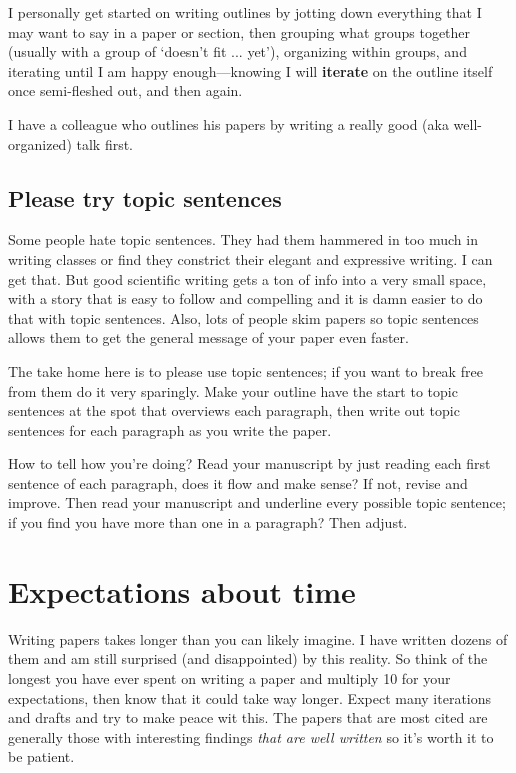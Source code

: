 \documentclass[11pt,letter]{article}
\begin{document}
I personally get started on writing outlines by jotting down everything that I may want to say in a paper or section, then grouping what groups together (usually with a group of `doesn't fit ... yet'), organizing within groups, and iterating until I am happy enough---knowing I will {\bf iterate} on the outline itself once semi-fleshed out, and then again. 

I have a colleague who outlines his papers by writing a really good (aka well-organized) talk first.

\subsection{Please try topic sentences}

Some people hate topic sentences. They had them hammered in too much in writing classes or find they constrict their elegant and expressive writing. I can get that. But good scientific writing gets a ton of info into a very small space, with a story that is easy to follow and compelling and it is damn easier to do that with topic sentences. Also, lots of people skim papers so topic sentences allows them to get the general message of your paper even faster. 

The take home here is to please use topic sentences; if you want to break free from them do it very sparingly. Make your outline have the start to topic sentences at the spot that overviews each paragraph, then write out topic sentences for each paragraph as you write the paper. 

How to tell how you're doing? Read your manuscript by just reading each first sentence of each paragraph, does it flow and make sense? If not, revise and improve. Then read your manuscript and underline every possible topic sentence; if you find you have more than one in a paragraph? Then adjust.

\section{Expectations about time}

Writing papers takes longer than you can likely imagine. I have written dozens of them and am still surprised (and disappointed) by this reality. So think of the longest you have ever spent on writing a paper and multiply 10 for your expectations, then know that it could take way longer. Expect many iterations and drafts and try to make peace wit this. The papers that are most cited are generally those with interesting findings \emph{that are well written} so it's worth it to be patient. 
\end{document}
